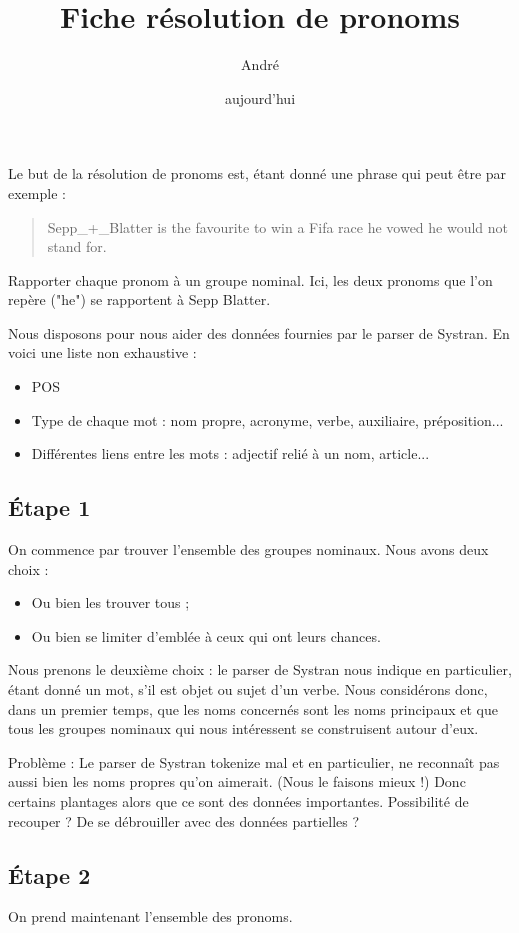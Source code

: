 \documentclass[a4paper,12pt]{article}
\title{Fiche résolution de pronoms}
\author{André} %
\date{aujourd'hui}
\begin{document}
\titrecourt %

Le but de la résolution de pronoms est, étant donné une phrase qui peut être par exemple :

\begin{quotation}
 Sepp_+_Blatter is the favourite to win a Fifa race he vowed he would not stand for.
\end{quotation}
Rapporter chaque pronom à un groupe nominal. Ici, les deux pronoms que l'on repère ("he") se rapportent à Sepp Blatter.

Nous disposons pour nous aider des données fournies par le parser de Systran. En voici une liste non exhaustive :
\begin{itemize}
 \item POS
 \item Type de chaque mot : nom propre, acronyme, verbe, auxiliaire, préposition...
 \item Différentes liens entre les mots : adjectif relié à un nom, article...
\end{itemize}


\subsection{Étape 1}
On commence par trouver l'ensemble des groupes nominaux. Nous avons deux choix :
\begin{itemize}
 \item Ou bien les trouver tous ;
 \item Ou bien se limiter d'emblée à ceux qui ont leurs chances.
\end{itemize}
Nous prenons le deuxième choix : le parser de Systran nous indique en particulier, étant donné un mot, s'il est objet ou sujet d'un verbe. Nous considérons donc, dans un premier temps, que les noms concernés sont les noms principaux et que tous 
les groupes nominaux qui nous intéressent se construisent autour d'eux.

Problème : Le parser de Systran tokenize mal et en particulier, ne reconnaît pas aussi bien les noms propres qu'on aimerait. (Nous le faisons mieux !) Donc certains plantages alors que ce sont des données importantes. Possibilité de recouper ? De se débrouiller avec des données partielles ?

\subsection{Étape 2}
On prend maintenant l'ensemble des pronoms.
\end{document}
